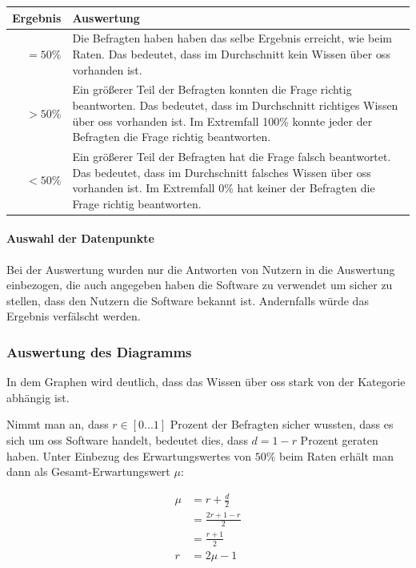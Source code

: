 \documentclass[a4paper]{article}
\begin{document}
                    \begin{tabularx}{\textwidth}{rX}
                        \textbf{Ergebnis} & \textbf{Auswertung} \\\hline
                        $= 50 \%$ & Die Befragten haben haben das selbe Ergebnis erreicht, wie beim Raten. Das bedeutet, dass im Durchschnitt kein Wissen über \gls{oss} vorhanden ist.\\
                        $> 50 \%$ & Ein größerer Teil der Befragten konnten die Frage richtig beantworten. Das bedeutet, dass im Durchschnitt richtiges Wissen über \gls{oss} vorhanden ist. Im Extremfall 100\% konnte jeder der Befragten die Frage richtig beantworten.\\
                        $< 50 \%$ & Ein größerer Teil der Befragten hat die Frage falsch beantwortet. Das bedeutet, dass im Durchschnitt falsches Wissen über \gls{oss} vorhanden ist. Im Extremfall 0\% hat keiner der Befragten die Frage richtig beantworten.  
                    \end{tabularx}
            
                \paragraph{Auswahl der Datenpunkte}
                    Bei der Auswertung wurden nur die Antworten von Nutzern in die Auswertung einbezogen, die auch angegeben haben die Software zu verwendet um sicher zu stellen, dass den Nutzern die Software bekannt ist. Andernfalls würde das Ergebnis verfälscht werden.
                    
            \subsubsection{Auswertung des Diagramms}
                In dem Graphen wird deutlich, dass das Wissen über \gls{oss} stark von der Kategorie abhängig ist. %
            
                Nimmt man an, dass $r \in \left[0...1\right]$ Prozent der Befragten sicher wussten, dass es sich um \gls{oss} Software handelt, bedeutet dies, dass $d = 1 - r$ Prozent geraten haben. Unter Einbezug des Erwartungswertes von $50 \%$ beim Raten erhält man dann als Gesamt-Erwartungswert $\mu$:
            
                \begin{equation}
                \begin{split}
                    \mu &= r + \frac{d}{2} \\
                        &= \frac{2r + 1 - r}{2} \\
                        &= \frac{r + 1}{2} \\
                    r   &= 2\mu - 1
                \end{split}
                \end{equation}
            
\end{document}
